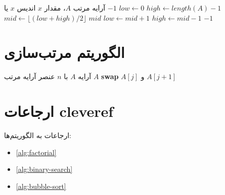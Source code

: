\begin{latin}
\begin{algorithm}
\caption{جستجوی دودویی}
\label{alg:binary-search}
\begin{algorithmic}[1]
    \Require آرایه مرتب $A$، مقدار $x$
    \Ensure اندیس $x$ یا $-1$
    \State $low \gets 0$
    \State $high \gets length(A) - 1$
        \State $mid \gets \lfloor (low + high) / 2 \rfloor$
            \State \Return $mid$
            \State $low \gets mid + 1$
        \Else
            \State $high \gets mid - 1$
        \EndIf
    \EndWhile
    \State \Return $-1$
\end{algorithmic}
\end{algorithm}
\end{latin}

\section{الگوریتم مرتب‌سازی}
\label{sec:sorting}

\begin{latin}
\begin{algorithm}
\caption{مرتب‌سازی حبابی}
\label{alg:bubble-sort}
\begin{algorithmic}[1]
    \Require آرایه $A$ با $n$ عنصر
    \Ensure آرایه مرتب $A$
                \State \textbf{swap} $A[j]$ و $A[j+1]$
            \EndIf
        \EndFor
    \EndFor
\end{algorithmic}
\end{algorithm}
\end{latin}

\section{ارجاعات cleveref}
\label{sec:references}

ارجاعات به الگوریتم‌ها:

\begin{itemize}
    \item \cref{alg:factorial}
    \item \cref{alg:binary-search}
    \item \cref{alg:bubble-sort}
\end{itemize}

